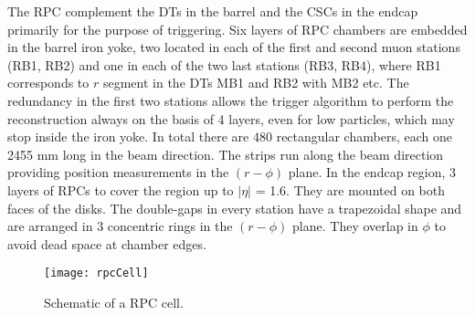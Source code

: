     The RPC complement the DTs in the barrel and the CSCs in the endcap 
      primarily for the purpose of triggering.
    Six layers of RPC chambers are embedded in the barrel iron yoke, two
      located in each of the first and second muon stations (RB1, RB2) and 
      one in each of the two last stations (RB3, RB4), where RB1 corresponds 
      to $r$ segment in the DTs MB1 and RB2 with MB2 etc. 
    The redundancy in the first two stations allows the trigger algorithm to 
      perform the reconstruction always on the basis of 4 layers, even for low 
      \pt particles, which may stop inside the iron yoke. 
    In total there are 480 rectangular chambers, each one 2455 mm
      long in the beam direction. 
    The strips run along the beam direction providing position measurements in 
      the $(r-\phi)$  plane. 
    In the endcap region, 3 layers of RPCs to cover the region up to $|\eta|$ =
      1.6. 
    They are mounted on both faces of the disks. 
    The double-gaps in every station have a trapezoidal shape and are arranged
      in 3 concentric rings in the $(r-\phi)$  plane.  
    They overlap in $\phi$ to avoid dead space at chamber edges.

    \begin{figure}[!Hhbt]
      \centering
      \texttt{[image: rpcCell]}
      \caption{Schematic of a RPC cell.}
      \label{fig:rpcSchem}
    \end{figure}
  
